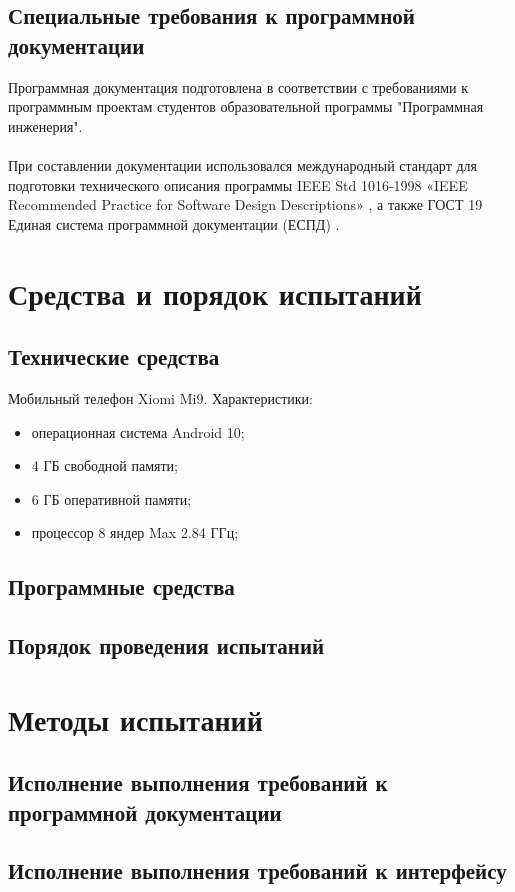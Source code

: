 \documentclass[draft]{article}
\begin{document}
\subsection{Специальные требования к программной документации}
Программная документация подготовлена в соответствии с требованиями к программным проектам студентов образовательной программы "{}Программная инженерия"{}.\\
~\\
При составлении документации использовался международный стандарт для подготовки технического описания программы IEEE Std 1016-1998 «IEEE Recommended Practice for Software Design Descriptions» \cite{litlink12}, а также ГОСТ 19 Единая система программной документации (ЕСПД) \cite{litlink13}.
\newpage
\section {Средства и порядок испытаний}
\subsection {Технические средства}
Мобильный телефон Xiomi Mi9. Характеристики:
\begin{itemize}
\item операционная система Android 10;
\item 4 ГБ свободной памяти;
\item 6 ГБ оперативной памяти;
\item процессор 8 яндер Max 2.84 ГГц;
\end{itemize}
\subsection {Программные средства}
\subsection {Порядок проведения испытаний}
\newpage
\section {Методы испытаний}
\subsection{Исполнение выполнения требований к программной документации}
\subsection{Исполнение выполнения требований к интерфейсу}
\end{document}

